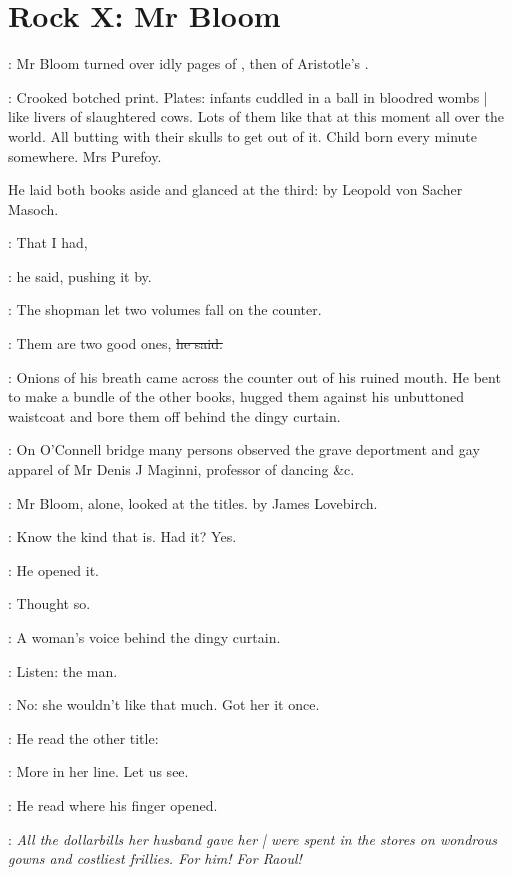 \section*{Rock X: Mr Bloom}


:
Mr Bloom turned over idly pages of
,
then of Aristotle's .

\BloomInt:
Crooked botched print.
Plates:
infants cuddled in a ball in bloodred wombs |
like livers of slaughtered cows.
Lots of them like that at this moment all over the world.
All butting with their skulls to get out of it.
Child born every minute somewhere.
Mrs Purefoy.%

He laid both books aside and glanced at the third:
by Leopold von Sacher Masoch.

\Bloom:
That I had,

:
he said,
pushing it by.

:
The shopman let two volumes fall on the counter.

\shopman:
Them are two good ones,
\sout{he said.}

:
Onions of his breath came across the counter
out of his ruined mouth.
He bent to make a bundle of the other books,
hugged them against his unbuttoned waistcoat
and bore them off behind the dingy curtain.

:
On O'Connell bridge
many persons observed the grave deportment
and gay apparel of Mr Denis J Maginni,
professor of dancing \&c.

:
Mr Bloom, alone,
looked at the titles.
 by James Lovebirch.

\BloomInt:
Know the kind that is.
Had it?
Yes.

:
He opened it.

\BloomInt:
Thought so.

:
A woman's voice behind the dingy curtain.

\BloomInt:
Listen: the man.

\BloomInt:
No:
she wouldn't like that much.
Got her it once.

:
He read the other title:

\BloomInt:
More in her line.
Let us see.

:
He read where his finger opened.

\BloomInt:
\emph{All the dollarbills her husband gave her |
were spent in the stores
on wondrous gowns and costliest frillies.
For him!
For Raoul!}

